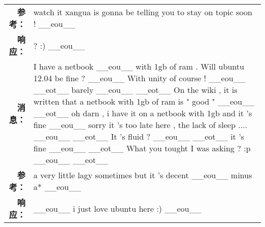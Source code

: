 \begin{tabularx}{\textwidth}{@{}rX@{}}
\textbf{参考：}&watch it xangua is gonna be telling you to stay on topic soon ! \_\_eou\_\_\\%
\textbf{响应：}&? :) \_\_eou\_\_\\%
\midrule%
\textbf{消息：}&I have a netbook \_\_eou\_\_ with 1gb of ram . Will ubuntu 12.04 be fine ? \_\_eou\_\_ With unity of course ! \_\_eou\_\_ \_\_eot\_\_ barely \_\_eou\_\_ \_\_eot\_\_ On the wiki , it is written that a netbook with 1gb of ram is " good " \_\_eou\_\_ \_\_eot\_\_ oh darn , i have it on a netbook with 1gb and it 's fine \_\_eou\_\_ sorry it 's too late here , the lack of sleep .... \_\_eou\_\_ \_\_eot\_\_ It 's fluid ? \_\_eou\_\_ \_\_eot\_\_ it 's fine \_\_eou\_\_ \_\_eot\_\_ What you tought I was asking ? :p \_\_eou\_\_ \_\_eot\_\_\\%
\textbf{参考：}&a very little lagy sometimes but it 's decent \_\_eou\_\_ minus a* \_\_eou\_\_\\%
\textbf{响应：}&\_\_eou\_\_ i just love ubuntu here :) \_\_eou\_\_\\%
\midrule\bottomrule%
%
\end{tabularx}